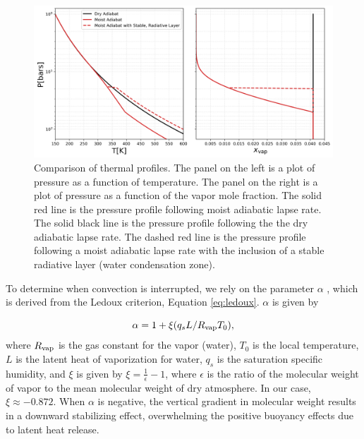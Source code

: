 \documentclass[11pt]{ucscthesisbs}
\begin{document}
\begin{figure}[ht!]
 \centerline{
  \includegraphics[width=6.5in]{figures/comparison_dry_vs_moist_lapse_rates.png}
 }
\caption[A Standard Interior Structure Model]
{Comparison of thermal profiles. The panel on the left is a plot of pressure as a function of temperature. The panel on the right is a plot of pressure as a function of the vapor mole fraction. The solid red line is the pressure profile following moist adiabatic lapse rate. The solid black line is the pressure profile following the the dry adiabatic lapse rate. The dashed red line is the pressure profile following a moist adiabatic lapse rate with the inclusion of a stable radiative layer (water condensation zone).} 
\label{fig:comparison_adiabatic_profiles}
\end{figure}


To determine when convection is interrupted, we rely on the parameter $\alpha$ \citep{friedson_2017}, which is derived from the Ledoux criterion, Equation \ref{eq:ledoux}. $\alpha$ is given by

\begin{equation}
  \alpha = 1 + \xi (q_{s} L / R_{\rm vap} T_{0}) ,
  \label{eq:alpha}
\end{equation}
where $R_{\rm vap}$ is the gas constant for the vapor (water), $T_{0}$ is the local temperature, $L$ is the latent heat of vaporization for water, $q_{s}$ is the saturation specific humidity, and $\xi$ is given by $\xi = \frac{1}{\epsilon} - 1$, where $\epsilon$ is the ratio of the molecular weight of vapor to the mean molecular weight of dry atmosphere. In our case, $\xi \approx -0.872$. When $\alpha$ is negative, the vertical gradient in molecular weight results in a downward stabilizing effect, overwhelming the positive buoyancy effects due to latent heat release.
\end{document}
